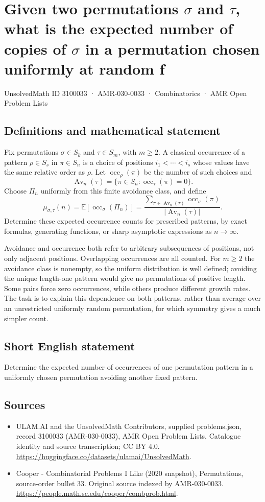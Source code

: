 \documentclass[11pt,a4paper]{article}
\begin{document}
\section*{Given two permutations $\sigma$ and $\tau$, what is the expected number of copies of $\sigma$ in a permutation chosen uniformly at random f}\label{3100033}
{\small UnsolvedMath ID 3100033 · AMR-030-0033 · Combinatorics · AMR Open Problem Lists}
\subsection{Definitions and mathematical statement}
Fix permutations $\sigma\in S_k$ and $\tau\in S_m$, with $m\ge2$.
A classical occurrence of a pattern $\rho\in S_s$ in
$\pi\in S_n$ is a choice of positions $i_1<\cdots<i_s$ whose
values have the same relative order as $\rho$. Let
$\operatorname{occ}_\rho(\pi)$ be the number of such choices and
\[
 \operatorname{Av}_n(\tau)=
       \{\pi\in S_n:\operatorname{occ}_\tau(\pi)=0\}.
\]
Choose $\Pi_n$ uniformly from this finite avoidance class, and define
\[
 \mu_{\sigma,\tau}(n)
   =\mathbb E[\operatorname{occ}_\sigma(\Pi_n)]
   =\frac{\sum_{\pi\in\operatorname{Av}_n(\tau)}
                       \operatorname{occ}_\sigma(\pi)}
          {|\operatorname{Av}_n(\tau)|}.
\]
Determine these expected occurrence counts for prescribed patterns,
by exact formulas, generating functions, or sharp asymptotic
expressions as $n\to\infty$.

Avoidance and occurrence both refer to arbitrary subsequences of
positions, not only adjacent positions. Overlapping occurrences
are all counted. For $m\ge2$ the avoidance class is nonempty, so
the uniform distribution is well defined; avoiding the unique
length-one pattern would give no permutations of positive length.
Some pairs force zero occurrences, while others produce different
growth rates. The task is to explain this dependence on both
patterns, rather than average over an unrestricted uniformly
random permutation, for which symmetry gives a much simpler count.
\subsection{Short English statement}
Determine the expected number of occurrences of one permutation pattern in a uniformly chosen permutation avoiding another fixed pattern.
\subsection{Sources}
\begin{itemize}
\item[S1] ULAM.AI and the UnsolvedMath Contributors, supplied problems.json, record 3100033 (AMR-030-0033), AMR Open Problem Lists. Catalogue identity and source transcription; CC BY 4.0.
\url{https://huggingface.co/datasets/ulamai/UnsolvedMath}.
\item[S2] Cooper - Combinatorial Problems I Like (2020 snapshot), Permutations, source-order bullet 33. Original source indexed by AMR-030-0033.
\url{https://people.math.sc.edu/cooper/combprob.html}.
\end{itemize}
\end{document}
